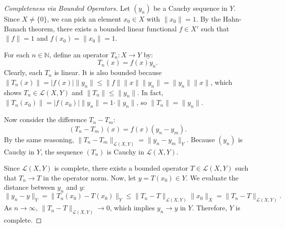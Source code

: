 \documentclass{article}
\begin{document}
\begin{proof}[Completeness via Bounded Operators]
    Let $(y_n)$ be a Cauchy sequence in $Y$. Since $X \neq \{0\}$, we can pick an element $x_0 \in X$ with $\|x_0\| = 1$. By the Hahn-Banach theorem, there exists a bounded linear functional $f \in X'$ such that $\|f\| = 1$ and $f(x_0) = \|x_0\| = 1$.

    For each $n \in \mathbb{N}$, define an operator $T_n : X \to Y$ by:
    \[ T_n(x) = f(x)y_n. \]
    Clearly, each $T_n$ is linear. It is also bounded because $\|T_n(x)\| = |f(x)| \|y_n\| \le \|f\| \|x\| \|y_n\| = \|y_n\| \|x\|$, which shows $T_n \in \mathcal{L}(X,Y)$ and $\|T_n\| \le \|y_n\|$. In fact, $\|T_n(x_0)\| = |f(x_0)| \|y_n\| = 1 \cdot \|y_n\|$, so $\|T_n\| = \|y_n\|$.

    Now consider the difference $T_n - T_m$:
    \[ (T_n - T_m)(x) = f(x)(y_n - y_m). \]
    By the same reasoning, $\|T_n - T_m\|_{\mathcal{L}(X,Y)} = \|y_n - y_m\|_Y$. Because $(y_n)$ is Cauchy in $Y$, the sequence $(T_n)$ is Cauchy in $\mathcal{L}(X,Y)$.

    Since $\mathcal{L}(X,Y)$ is complete, there exists a bounded operator $T \in \mathcal{L}(X,Y)$ such that $T_n \to T$ in the operator norm. Now, let $y = T(x_0) \in Y$. We evaluate the distance between $y_n$ and $y$:
    \[ \|y_n - y\|_Y = \|T_n(x_0) - T(x_0)\|_Y \le \|T_n - T\|_{\mathcal{L}(X,Y)} \|x_0\|_X = \|T_n - T\|_{\mathcal{L}(X,Y)}. \]
    As $n \to \infty$, $\|T_n - T\|_{\mathcal{L}(X,Y)} \to 0$, which implies $y_n \to y$ in $Y$. Therefore, $Y$ is complete.
\end{proof}

\vspace{0.5cm}
\end{document}
